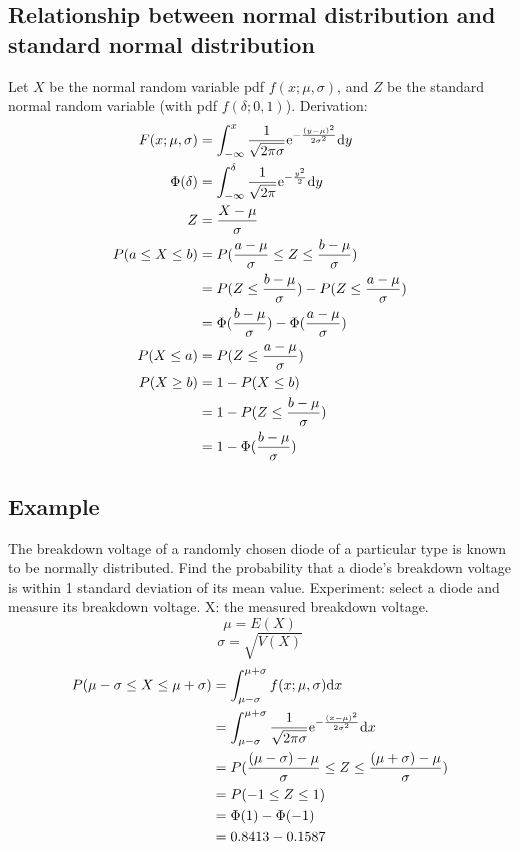 \documentclass{math}
\begin{document}
\subsection*{Relationship between normal distribution and standard normal
             distribution}
Let \( X \) be the normal random variable pdf \( f(x;\mu,\sigma) \), and
\( Z \) be the standard normal random variable (with pdf \( f(\delta;0,1) \)).
Derivation:
\begin{align*}
  F(x;\mu,\sigma) &= \int_{-\infty}^{x}\frac{1}{\sqrt{2\pi\sigma}}
    \mathrm{e}^{-\frac{(y-\mu)^{2}}{2\sigma^{2}}}\mathrm{d}{y} \\
  \Phi(\delta) &= \int_{-\infty}^{\delta}\frac{1}{\sqrt{2\pi}}
    \mathrm{e}^{-\frac{y^{2}}{2}}\mathrm{d}{y} \\
  Z &= \frac{X-\mu}{\sigma} \\
  P(a\leq X\leq b) &= P(\frac{a-\mu}{\sigma}\leq Z\leq\frac{b-\mu}{\sigma}) \\
  &= P(Z\leq\frac{b-\mu}{\sigma})-P(Z\leq\frac{a-\mu}{\sigma}) \\
  &= \Phi(\frac{b-\mu}{\sigma})-\Phi(\frac{a-\mu}{\sigma}) \\
  P(X\leq a) &= P(Z\leq\frac{a-\mu}{\sigma}) \\
  P(X\geq b) &= 1-P(X\leq b) \\
  &= 1-P(Z\leq\frac{b-\mu}{\sigma}) \\
  &= 1-\Phi(\frac{b-\mu}{\sigma})
\end{align*}

\subsection*{Example}
The breakdown voltage of a randomly chosen diode of a particular type is known
to be normally distributed. Find the probability that a diode's breakdown
voltage is within 1 standard deviation of its mean value. Experiment: select
a diode and measure its breakdown voltage. X: the measured breakdown voltage.
\[ \mu = E(X) \]
\[ \sigma = \sqrt{V(X)} \]
\begin{align*}
  P(\mu-\sigma\leq X\leq\mu+\sigma) &= \int_{\mu-\sigma}^{\mu+\sigma}
    f(x;\mu,\sigma)\mathrm{d}{x} \\
  &= \int_{\mu-\sigma}^{\mu+\sigma}\frac{1}{\sqrt{2\pi\sigma}}
    \mathrm{e}^{-\frac{(x-\mu)^{2}}{2\sigma^{2}}}\mathrm{d}{x} \\
  &= P(\frac{(\mu-\sigma)-\mu}{\sigma}\leq
    Z\leq\frac{(\mu+\sigma)-\mu}{\sigma}) \\
  &= P(-1\leq Z\leq1) \\
  &= \Phi(1)-\Phi(-1) \\
  &= 0.8413-0.1587
\end{align*}
\end{document}
